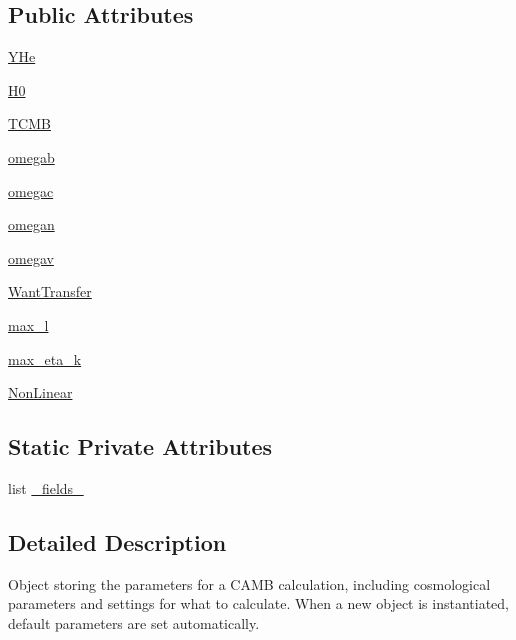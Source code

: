 \subsection*{Public Attributes}
\begin{DoxyCompactItemize}
\item 
\mbox{\hyperlink{classcamb_1_1model_1_1CAMBparams_a54a670bce83f5d6598fba3d39ab0b122}{Y\+He}}
\item 
\mbox{\hyperlink{classcamb_1_1model_1_1CAMBparams_a8ff1806ce4bce8beee6ac5e305d79b5d}{H0}}
\item 
\mbox{\hyperlink{classcamb_1_1model_1_1CAMBparams_a1423460bd44a740728bf2e05fa63f443}{T\+C\+MB}}
\item 
\mbox{\hyperlink{classcamb_1_1model_1_1CAMBparams_ac3a163f249dc8801d423d1ff671e5c6c}{omegab}}
\item 
\mbox{\hyperlink{classcamb_1_1model_1_1CAMBparams_a621ac3974c12161184974520b0ca01d8}{omegac}}
\item 
\mbox{\hyperlink{classcamb_1_1model_1_1CAMBparams_a1966b51d005663ffe5c5efd278b124a0}{omegan}}
\item 
\mbox{\hyperlink{classcamb_1_1model_1_1CAMBparams_a489b7658770f1fd5e0bd4c87cb55ddc5}{omegav}}
\item 
\mbox{\hyperlink{classcamb_1_1model_1_1CAMBparams_a6c37475fda6760fc9b83d2d1de27c1e0}{Want\+Transfer}}
\item 
\mbox{\hyperlink{classcamb_1_1model_1_1CAMBparams_acd57e8ef0f7dd76b1b4dab467980c247}{max\+\_\+l}}
\item 
\mbox{\hyperlink{classcamb_1_1model_1_1CAMBparams_aa45b95918852065ae4bb41157369d8bd}{max\+\_\+eta\+\_\+k}}
\item 
\mbox{\hyperlink{classcamb_1_1model_1_1CAMBparams_a72bc392336634a5a3451f4e53aa995fe}{Non\+Linear}}
\end{DoxyCompactItemize}
\subsection*{Static Private Attributes}
\begin{DoxyCompactItemize}
\item 
list \mbox{\hyperlink{classcamb_1_1model_1_1CAMBparams_adeacd17b206eba9348a886c098453b08}{\+\_\+fields\+\_\+}}
\end{DoxyCompactItemize}


\subsection{Detailed Description}
\begin{DoxyVerb}Object storing the parameters for a CAMB calculation, including cosmological parameters and
settings for what to calculate. When a new object is instantiated, default parameters are set automatically.
\end{DoxyVerb}
 

